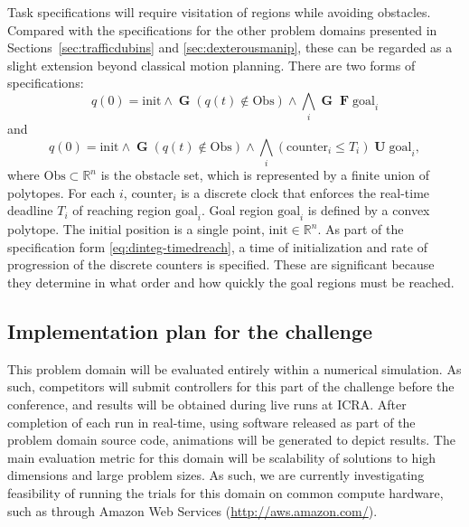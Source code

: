\documentclass[12pt]{amsart}
\DeclareMathOperator{\Galways}{\mathbf{G}}
\DeclareMathOperator{\Feventually}{\mathbf{F}}
\DeclareMathOperator{\Uuntil}{\mathbf{U}}
\begin{document}
Task specifications will require visitation of regions while avoiding obstacles.
Compared with the specifications for the other problem domains presented in
Sections~\ref{sec:trafficdubins} and \ref{sec:dexterousmanip}, these can be
regarded as a slight extension beyond classical motion planning.  There are two
forms of specifications:
\begin{equation}\label{eq:dinteg-surveillance}
q(0) = \mathrm{init} \wedge \Galways \left( q(t) \notin \mathrm{Obs} \right) \wedge \bigwedge_{i} \Galways \Feventually \mathrm{goal}_i
\end{equation}
and
\begin{equation}\label{eq:dinteg-timedreach}
q(0) = \mathrm{init} \wedge \Galways \left( q(t) \notin \mathrm{Obs} \right) \wedge \bigwedge_{i} \left( \mathrm{counter}_i \leq T_{i} \right) \Uuntil \mathrm{goal}_i ,
\end{equation}
where $\mathrm{Obs} \subset \mathbb{R}^n$ is the obstacle set, which is
represented by a finite union of polytopes.  For each $i$, $\mathrm{counter}_i$
is a discrete clock that enforces the real-time deadline $T_i$ of reaching
region $\mathrm{goal}_i$.  Goal region $\mathrm{goal}_i$ is defined by a convex
polytope.  The initial position is a single point, $\mathrm{init}\in
\mathbb{R}^n$.  As part of the specification form \eqref{eq:dinteg-timedreach},
a time of initialization and rate of progression of the discrete counters is
specified.  These are significant because they determine in what order and how
quickly the goal regions must be reached.

\subsection{Implementation plan for the challenge}

This problem domain will be evaluated entirely within a numerical simulation.  As
such, competitors will submit controllers for this part of the challenge before
the conference, and results will be obtained during live runs at ICRA.  After
completion of each run in real-time, using software released as part of the
problem domain source code, animations will be generated to depict results.  
The main evaluation metric for this domain will be scalability of solutions to high dimensions and
large problem sizes. As such, we are currently investigating feasibility 
of running the trials for this domain on common compute hardware,
such as through Amazon Web Services (\url{http://aws.amazon.com/}).
\end{document}
